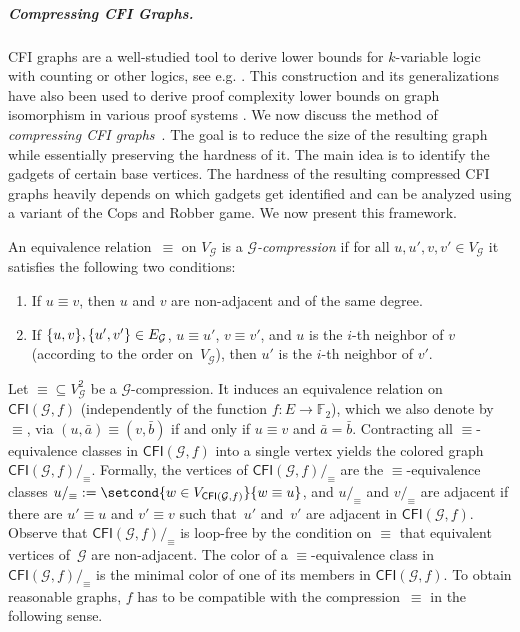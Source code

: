 \documentclass[a4paper,english, thm-restate]{lipics-v2021}
\newcommand{\defining}[1]{\emph{#1}}
\DeclarePairedDelimiter\set{\lbrace}{\rbrace}
\newcommand{\comp}{\equiv}
\newcommand{\CFIsym}{\mathsf{CFI}}
\newcommand{\CFI}[1]{\CFIsym(#1)}
\newcommand{\compCFI}[2]{\CFI{#1}/_{#2}}
\newcommand{\FF}{\mathbb{F}}
\newcommand{\tup}[1]{\bar{#1}}
\newcommand{\graphG}{\mathcal{G}}
\newcommand{\vertexG}{V_{\graphG}}
\newcommand{\edgeG}{E_{\graphG}}
\begin{document}
\subparagraph*{Compressing CFI Graphs.}

CFI graphs are a well-studied tool to derive lower bounds for
$k$-variable logic with counting or other logics, see e.g.
\cite{CaiFuererImmerman1992, Furer2001, BerkholzNordstrom16,
DawarGraedelLichter22, Lichter2023b}. This construction and its
generalizations have also been used to derive proof complexity lower bounds on graph isomorphism in various
proof systems
\cite{DBLP:conf/sat/Toran13,DBLP:conf/icalp/BerkholzG15,DBLP:conf/soda/BerkholzG17,DBLP:conf/soda/ODonnellWWZ14,DBLP:conf/sat/ToranW23,SchweitzerSeebach21}.
We now discuss the method of \emph{compressing CFI graphs}~\cite{DBLP:conf/focs/GroheLNS23}.
The goal is to reduce the size of the resulting graph
while essentially preserving the hardness of it.
The main idea is to identify the gadgets of certain base vertices.
The hardness of the resulting compressed CFI graphs
heavily depends on which gadgets get identified
and can be analyzed using a variant of the Cops and Robber game.
We now present this framework.

\begin{definition}
        An equivalence relation~$\comp$ on $\vertexG$ is a \defining{$\graphG$-compression} if for all $u,u',v, v' \in \vertexG$ it satisfies the following two conditions:
        \begin{enumerate}
                \item If $u \comp v$, then
                $u$ and $v$ are non-adjacent and of the same degree.
                \item \label{itm:compression-order-agree} If $\set{u,v},\set{u',v'} \in \edgeG$, $u \comp u'$, $v \comp v'$, and $u$ is the $i$-th neighbor of $v$ (according to the order on~$\vertexG$), then $u'$ is the $i$-th neighbor of $v'$.
        \end{enumerate}
\end{definition}
 
\noindent Let ${\comp} \subseteq \vertexG^2$ be a $\graphG$-compression.
It induces an equivalence relation on $\CFI{\graphG,f}$ (independently of the function $f \colon E \to \FF_2$), which we also denote by $\comp$, via
$(u, \tup{a}) \comp (v, \tup{b})$
if and only if $u \comp v$ and $\tup{a} = \tup{b}$.
Contracting all $\comp$\nobreakdash-equivalence classes in $\CFI{\graphG,f}$ into a single vertex yields the colored graph $\compCFI{\graphG,f}{\comp}$.
Formally, the vertices of $\compCFI{\graphG,f}{\comp}$ are the $\comp$-equivalence classes $u/_{\comp} := \setcond{w \in V_{\CFI{\graphG,f}}}{w \comp u}$,
and $u/_\comp$ and $v/_\comp$ are adjacent
if there are $u'\comp u$ and $v'\comp v$ such that~$u'$ and~$v'$ are adjacent in $\CFI{\graphG,f}$.
Observe that $\compCFI{\graphG,f}{\comp}$ is loop-free by the condition on $\comp$ that equivalent vertices of~$\graphG$ are non-adjacent.
The color of a $\comp$\nobreakdash-equivalence class in $\compCFI{\graphG,f}{\comp}$ is the minimal color of one of its members in $\CFI{\graphG,f}$.
To obtain reasonable graphs, $f$ has to be compatible with the compression~$\comp$ in the following sense.
\end{document}
